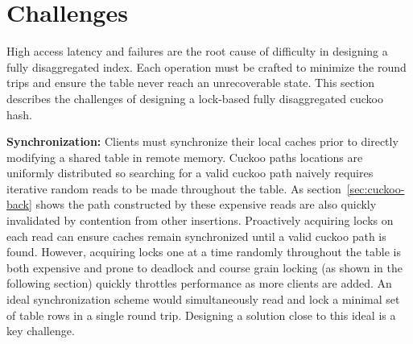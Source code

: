 \section{Challenges}
\label{sec:problems}

High access latency and failures are the root cause of
difficulty in designing a fully disaggregated index. Each
operation must be crafted to minimize the round trips and
ensure the table never reach an unrecoverable state. This
section describes the challenges of designing a lock-based
fully disaggregated cuckoo hash.

\textbf{Synchronization:} Clients must synchronize their
local caches prior to directly modifying a shared table in
remote memory. Cuckoo paths locations are uniformly
distributed so searching for a valid cuckoo path naively
requires iterative random reads to be made throughout the
table. As section~\ref{sec:cuckoo-back} shows the path
constructed by these expensive reads are also quickly
invalidated by contention from other insertions.
Proactively acquiring locks on each read can ensure caches
remain synchronized until a valid cuckoo path is found.
However, acquiring locks one at a time randomly throughout
the table is both expensive and prone to deadlock and course
grain locking (as shown in the following section) quickly
throttles performance as more clients are added. An ideal
synchronization scheme would simultaneously read and lock a
minimal set of table rows in a single round trip. Designing
a solution close to this ideal is a key challenge.




